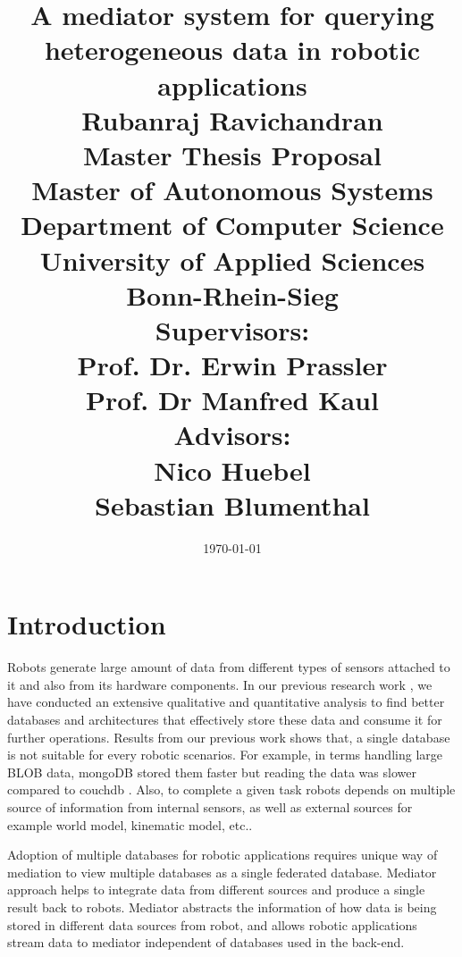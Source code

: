 \documentclass[12pt]{article}
\begin{document}
\title{\Large A mediator system for querying heterogeneous data in robotic applications\\
[6mm]
\Large Rubanraj Ravichandran\\
[12mm]
\Large Master Thesis Proposal\\
\small Master of Autonomous Systems\\
[12mm]
\Large Department of Computer Science\\
University of Applied Sciences Bonn-Rhein-Sieg\\
[12mm]
\Large Supervisors:\\
Prof. Dr. Erwin Prassler\\
Prof. Dr Manfred Kaul\\
\Large Advisors:\\
Nico Huebel\\
Sebastian Blumenthal
}
\date{\today}
\maketitle
\newpage
\section{Introduction}

Robots generate large amount of data from different types of sensors attached to it and also from its hardware components. In our previous research work \cite{ravichandranworkbench}, we have conducted an extensive qualitative and quantitative analysis to find better databases and architectures that effectively store these data and consume it for further operations. Results from our previous work shows that, a single database is not suitable for every robotic scenarios. For example, in terms handling large BLOB data, mongoDB stored them faster but reading the data was slower compared to couchdb \cite{ravichandranworkbench}. Also, to complete a given task robots depends on multiple source of information from internal sensors, as well as external sources for example world model, kinematic model, etc.. 

Adoption of multiple databases for robotic applications requires unique way of mediation to view multiple databases as a single federated database. Mediator approach helps to integrate data from different sources and produce a single result back to robots. Mediator abstracts the information of how data is being stored in different data sources from robot, and allows robotic applications stream data to mediator independent of databases used in the back-end.
\end{document}
